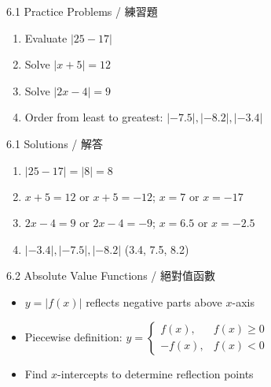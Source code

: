 \documentclass[aspectratio=169]{beamer}
\begin{document}
\begin{frame}{6.1 Practice Problems / 練習題}
    \begin{tcolorbox}[colback=lightgray,colframe=accent,title=Practice]
        \footnotesize
        \begin{enumerate}
            \item Evaluate $|25 - 17|$
            \item Solve $|x+5| = 12$
            \item Solve $|2x-4| = 9$
            \item Order from least to greatest: $|-7.5|, |-8.2|, |-3.4|$
        \end{enumerate}
    \end{tcolorbox}
\end{frame}

\begin{frame}{6.1 Solutions / 解答}
    \begin{tcolorbox}[colback=lightgray,colframe=accent,title=Solutions]
        \footnotesize
        \begin{enumerate}
            \item $|25 - 17| = |8| = 8$
            \item $x+5 = 12$ or $x+5 = -12$; $x = 7$ or $x = -17$
            \item $2x-4 = 9$ or $2x-4 = -9$; $x = 6.5$ or $x = -2.5$
            \item $|-3.4|, |-7.5|, |-8.2|$ (3.4, 7.5, 8.2)
        \end{enumerate}
    \end{tcolorbox}
\end{frame}

\begin{frame}{6.2 Absolute Value Functions / 絕對值函數}
    \begin{tcolorbox}[colback=lightgray,colframe=primary,title=Key Points]
        \footnotesize
        \begin{itemize}
            \item $y = |f(x)|$ reflects negative parts above $x$-axis
            \item Piecewise definition: $y = \begin{cases} f(x), & f(x) \geq 0 \\ -f(x), & f(x) < 0 \end{cases}$
            \item Find $x$-intercepts to determine reflection points
        \end{itemize}
    \end{tcolorbox}
    \vspace{0.5em}
    \begin{center}
    \end{center}
\end{frame}
\end{document}
